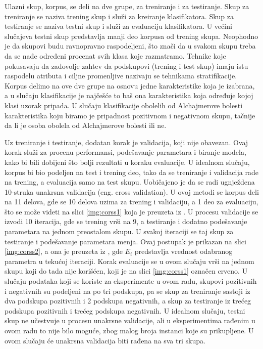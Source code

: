 \documentclass[12pt,oneside]{memoir}
\begin{document}
Ulazni skup, korpus, se deli na dve grupe, za treniranje i za testiranje. Skup za treniranje se naziva trening skup i služi za kreiranje klasifikatora. Skup za testiranje se naziva testni skup i služi za evaluaciju klasifikatora. U većini slučajeva testni skup predstavlja manji deo korpusa od trening skupa.  Neophodno je da skupovi budu ravnopravno raspodeljeni, što znači da u svakom skupu treba da se nađe određeni procenat svih klasa koje razmatramo. Tehnike koje pokusavaju da zadovolje zahtev da podskupovi (trening i test skup) imaju istu raspodelu atributa i ciljne promenljive nazivaju se tehnikama stratifikacije.  Korpus delimo na ove dve grupe na osnovu jedne karakteristike koja je izabrana, a u slučaju klasifikacije je najčešće to baš ona karakteristika koja određuje kojoj klasi uzorak pripada. U slučaju klasifikacije obolelih od Alchajmerove bolesti karakteristika koju biramo je pripadnost pozitivnom i negativnom skupu, tačnije da li je osoba obolela od Alchajmerove bolesti ili ne. 

Uz treniranje i testiranje, dodatan korak je validacija, koji nije obavezan. Ovaj korak služi za procenu performansi, podešavanje parametara i biranje modela, kako bi bili dobijeni što bolji rezultati u koraku evaluacije. 
\newpage
U idealnom slučaju, korpus bi bio podeljen na test i trening deo, tako da se treniranje i validacija rade na trening, a evaluacija samo na test skupu. Uobičajeno je da se radi ugnježdena 10-struka unakrsna validacija (eng. cross validation).  
U ovoj metodi se korpus deli na 11 delova, gde se 10 delova uzima za trening i validaciju, a 1 deo za evaluaciju, što se može videti na slici \ref{img:corss1} koja je preuzeta iz \cite{cross}.  U procesu validacije se izvodi 10 iteracija, gde se trening vrši na 9, a testiranje i dodatno podešavanje parametara na jednom preostalom skupu. U svakoj iteraciji se taj skup za testiranje i podešavanje parametara menja.  Ovaj postupak je prikazan na slici \ref{img:corss2}, a ona je preuzeta iz \cite{cross}, gde $E_i$ predstavlja vrednost odabranog parametra u tekućoj iteraciji. Korak evaluacije se u ovom slučaju vrši na jednom skupu koji do tada nije korišćen, koji je na slici \ref{img:corss1} označen crveno. 
U slučaju podataka koji se koriste za eksperimente u ovom radu, skupovi pozitivnih i negativnih su podeljeni na po tri podskupa, pa se skup za treniranje sastoji iz dva podskupa pozitivnih i 2 podskupa negativnih, a skup za testiranje iz trećeg podskupa pozitivnih i trećeg podskupa negativnih.  U idealnom slučaju, testni skup ne učestvuje u procesu unakrsne validacije, ali u eksperimentima rađenim u ovom radu to nije bilo moguće, zbog malog broja instanci koje su prikupljene.  U ovom slučaju će unakrsna validacija biti rađena na sva tri skupa.
\end{document}
